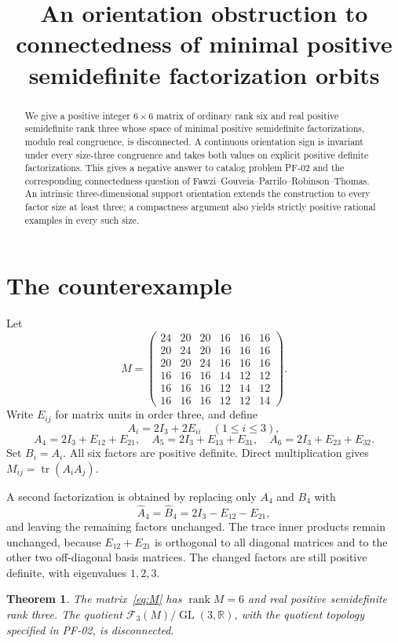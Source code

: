 \documentclass[11pt]{article}
\title{An orientation obstruction to connectedness of minimal positive semidefinite factorization orbits}
\author{}\date{}
\newtheorem{theorem}{Theorem}
\newcommand{\tr}{\operatorname{tr}}
\newcommand{\GL}{\operatorname{GL}}
\newcommand{\rank}{\operatorname{rank}}
\begin{document}
\maketitle
\begin{abstract}
We give a positive integer $6\times6$ matrix of ordinary rank six and real positive semidefinite rank three whose space of minimal positive semidefinite factorizations, modulo real congruence, is disconnected. A continuous orientation sign is invariant under every size-three congruence and takes both values on explicit positive definite factorizations. This gives a negative answer to catalog problem PF-02 and the corresponding connectedness question of Fawzi--Gouveia--Parrilo--Robinson--Thomas. An intrinsic three-dimensional support orientation extends the construction to every factor size at least three; a compactness argument also yields strictly positive rational examples in every such size.
\end{abstract}

\section{The counterexample}
Let
\begin{equation}\label{eq:M}
M=\begin{pmatrix}
24&20&20&16&16&16\\
20&24&20&16&16&16\\
20&20&24&16&16&16\\
16&16&16&14&12&12\\
16&16&16&12&14&12\\
16&16&16&12&12&14
\end{pmatrix}.
\end{equation}
Write $E_{ij}$ for matrix units in order three, and define
\[
A_i=2I_3+2E_{ii}\quad(1\leq i\leq3),
\]
\[
A_4=2I_3+E_{12}+E_{21},\quad
A_5=2I_3+E_{13}+E_{31},\quad
A_6=2I_3+E_{23}+E_{32}.
\]
Set $B_i=A_i$. All six factors are positive definite. Direct multiplication gives $M_{ij}=\tr(A_iA_j)$.

A second factorization is obtained by replacing only $A_4$ and $B_4$ with
\[
\widehat A_4=\widehat B_4=2I_3-E_{12}-E_{21},
\]
and leaving the remaining factors unchanged. The trace inner products remain unchanged, because $E_{12}+E_{21}$ is orthogonal to all diagonal matrices and to the other two off-diagonal basis matrices. The changed factors are still positive definite, with eigenvalues $1,2,3$.

\begin{theorem}\label{thm:main}
The matrix~\eqref{eq:M} has $\rank M=6$ and real positive semidefinite rank three. The quotient $\mathcal F_3(M)/\GL(3,\mathbb R)$, with the quotient topology specified in PF-02, is disconnected.
\end{theorem}
\end{document}
